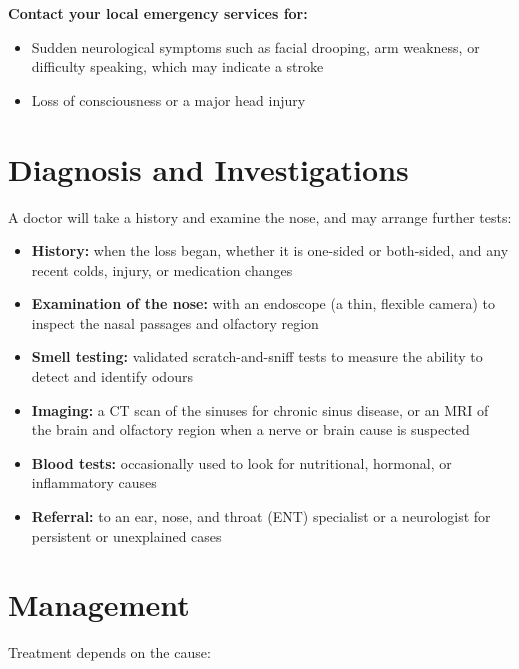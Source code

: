 \textbf{Contact your local emergency services for:}
\begin{itemize}
    \item Sudden neurological symptoms such as facial drooping, arm weakness, or difficulty speaking, which may indicate a stroke
    \item Loss of consciousness or a major head injury
\end{itemize}

\section*{Diagnosis and Investigations}
A doctor will take a history and examine the nose, and may arrange further tests:

\begin{itemize}
    \item \textbf{History:} when the loss began, whether it is one-sided or both-sided, and any recent colds, injury, or medication changes
    \item \textbf{Examination of the nose:} with an endoscope (a thin, flexible camera) to inspect the nasal passages and olfactory region
    \item \textbf{Smell testing:} validated scratch-and-sniff tests to measure the ability to detect and identify odours
    \item \textbf{Imaging:} a CT scan of the sinuses for chronic sinus disease, or an MRI of the brain and olfactory region when a nerve or brain cause is suspected
    \item \textbf{Blood tests:} occasionally used to look for nutritional, hormonal, or inflammatory causes
    \item \textbf{Referral:} to an ear, nose, and throat (ENT) specialist or a neurologist for persistent or unexplained cases
\end{itemize}

\section*{Management}
Treatment depends on the cause:

